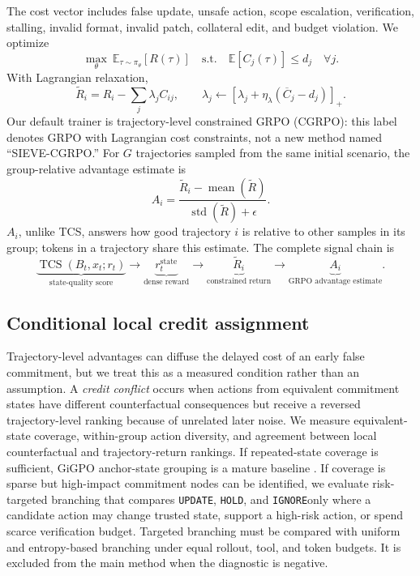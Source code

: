 \documentclass{article}
\newcommand{\update}{\texttt{UPDATE}}
\newcommand{\hold}{\texttt{HOLD}}
\newcommand{\ignore}{\texttt{IGNORE}}
\newcommand{\tcs}{\operatorname{TCS}}
\begin{document}
The cost vector includes false update, unsafe action, scope escalation, verification, stalling, invalid format, invalid patch, collateral edit, and budget violation. We optimize
\begin{equation}
\max_\theta\ \mathbb E_{\tau\sim\pi_\theta}[R(\tau)]
\quad\text{s.t.}\quad \mathbb E[C_j(\tau)]\leq d_j\quad\forall j.
\end{equation}
With Lagrangian relaxation,
\begin{equation}
\widetilde R_i=R_i-\sum_j\lambda_j C_{ij},\qquad
\lambda_j\leftarrow\left[\lambda_j+\eta_\lambda(\overline C_j-d_j)\right]_+.
\end{equation}
Our default trainer is trajectory-level constrained GRPO (CGRPO): this label denotes GRPO with Lagrangian cost constraints, not a new method named ``SIEVE-CGRPO.'' For $G$ trajectories sampled from the same initial scenario, the group-relative advantage estimate is
\begin{equation}
A_i=\frac{\widetilde R_i-\operatorname{mean}(\widetilde R)}
{\operatorname{std}(\widetilde R)+\epsilon}.
\end{equation}
$A_i$, unlike TCS, answers how good trajectory $i$ is relative to other samples in its group; tokens in a trajectory share this estimate. The complete signal chain is
\begin{equation}
\underbrace{\tcs(B_t,x_t;r_t)}_{\text{state-quality score}}
\rightarrow\underbrace{r_t^{\mathrm{state}}}_{\text{dense reward}}
\rightarrow\underbrace{\widetilde R_i}_{\text{constrained return}}
\rightarrow\underbrace{A_i}_{\text{GRPO advantage estimate}}.
\end{equation}

\subsection{Conditional local credit assignment}

Trajectory-level advantages can diffuse the delayed cost of an early false commitment, but we treat this as a measured condition rather than an assumption. A \emph{credit conflict} occurs when actions from equivalent commitment states have different counterfactual consequences but receive a reversed trajectory-level ranking because of unrelated later noise. We measure equivalent-state coverage, within-group action diversity, and agreement between local counterfactual and trajectory-return rankings. If repeated-state coverage is sufficient, GiGPO anchor-state grouping is a mature baseline \citep{feng2025gigpo}. If coverage is sparse but high-impact commitment nodes can be identified, we evaluate risk-targeted branching that compares \update, \hold, and \ignore only where a candidate action may change trusted state, support a high-risk action, or spend scarce verification budget. Targeted branching must be compared with uniform and entropy-based branching under equal rollout, tool, and token budgets. It is excluded from the main method when the diagnostic is negative.
\end{document}
